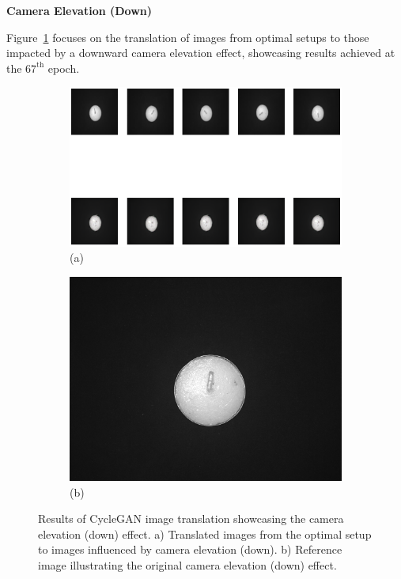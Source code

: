 \documentclass[12pt,DIV14,BCOR12mm,a4paper,footinclude=false,headinclude,parskip=half-,twoside,openright,cleardoublepage=empty,toc=index,bibliography=totoc,listof=totoc]{scrreprt}
\numberwithin{equation}{chapter}
\begin{document}
\textbf{Camera Elevation (Down)}

Figure~\ref{fig:camera_elevation_down_result} focuses on the translation of images from optimal setups to those impacted by a downward camera elevation effect, showcasing results achieved at the \( 67^{\text{th}} \) epoch.

\begin{figure}
    \centering
    \begin{subfigure}[b]{1.0\textwidth}
        \centering
        \includegraphics[width=\textwidth]{../media/candles_bright.png}
        \caption*{(a)}
    \end{subfigure}
    \hfill
    \begin{subfigure}[b]{0.25\textwidth}
        \centering
        \includegraphics[width=\textwidth]{../media/candles_bright_real.png}
        \caption*{(b)}
    \end{subfigure}
    \caption{Results of CycleGAN image translation showcasing the camera elevation (down) effect. a) Translated images from the optimal setup to images influenced by camera elevation (down). b) Reference image illustrating the original camera elevation (down) effect.}
    \label{fig:camera_elevation_down_result}
\end{figure}
\end{document}
